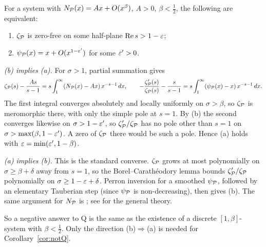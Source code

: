 \begin{remark}\label{rem:equiv}
For a system with $N_{\mathcal{P}}(x)=Ax+O(x^{\beta})$, $A>0$, $\beta<\tfrac12$, the following are equivalent:
\begin{enumerate}[label=(\alph*)]
\item $\zeta_{\mathcal{P}}$ is zero-free on some half-plane $\operatorname{Re}s>1-\varepsilon$;
\item $\psi_{\mathcal{P}}(x)=x+O(x^{1-\varepsilon'})$ for some $\varepsilon'>0$.
\end{enumerate}
\emph{(b) implies (a).} For $\sigma>1$, partial summation gives
\[
  \zeta_{\mathcal{P}}(s)-\frac{As}{s-1}=s\int_1^\infty(N_{\mathcal{P}}(x)-Ax)\,x^{-s-1}\,dx,\qquad
  -\frac{\zeta_{\mathcal{P}}'(s)}{\zeta_{\mathcal{P}}(s)}-\frac{s}{s-1}=s\int_1^\infty(\psi_{\mathcal{P}}(x)-x)\,x^{-s-1}\,dx.
\]
The first integral converges absolutely and locally uniformly on $\sigma>\beta$, so $\zeta_{\mathcal{P}}$ is meromorphic there, with only
the simple pole at $s=1$. By (b) the second converges likewise on $\sigma>1-\varepsilon'$, so $\zeta_{\mathcal{P}}'/\zeta_{\mathcal{P}}$ has no pole other
than $s=1$ on $\sigma>\max(\beta,1-\varepsilon')$. A zero of $\zeta_{\mathcal{P}}$ there would be such a pole. Hence (a) holds with
$\varepsilon=\min(\varepsilon',1-\beta)$.

\emph{(a) implies (b).} This is the standard converse. $\zeta_{\mathcal{P}}$ grows at most polynomially on $\sigma\ge\beta+\delta$ away from
$s=1$, so the Borel--Carath\'eodory lemma bounds $\zeta_{\mathcal{P}}'/\zeta_{\mathcal{P}}$ polynomially on $\sigma\ge1-\varepsilon+\delta$. Perron
inversion for a smoothed $\psi_{\mathcal{P}}$, followed by an elementary Tauberian step (since $\psi_{\mathcal{P}}$ is non-decreasing), then gives
(b). The same argument for $N_{\mathcal{P}}$ is \cite[Remark~4.1]{BDR}; see \cite{DiamondZhang2016} for the general theory.

So a negative answer to Q is the same as the existence of a discrete $[1,\beta]$-system with $\beta<\tfrac12$. Only the direction
(b)$\Rightarrow$(a) is needed for Corollary~\ref{cor:notQ}.
\end{remark}

